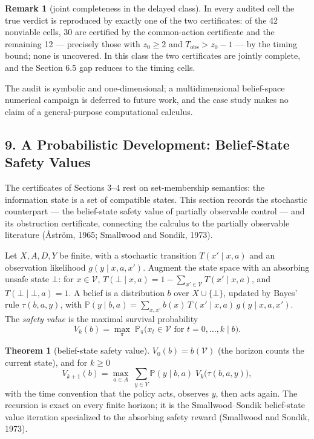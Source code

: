 \documentclass[10pt,twocolumn]{article}
\theoremstyle{definition}
\newtheorem{theorem}{Theorem}
\newtheorem{remark}{Remark}
\begin{document}
\begin{remark}[joint completeness in the delayed class]\label{rem:coverage}
In every audited cell the true verdict is reproduced by exactly one of the two certificates: of the 42 nonviable cells, 30 are certified by the common-action certificate and the remaining 12 --- precisely those with \(z_{0} \ge 2\) and \(T_{\mathrm{obs}} > z_{0} - 1\) --- by the timing bound; none is uncovered. In this class the two certificates are jointly complete, and the Section 6.5 gap reduces to the timing cells.
\end{remark}

The audit is symbolic and one-dimensional; a multidimensional belief-space
numerical campaign is deferred to future work, and the case study makes
no claim of a general-purpose computational calculus.

\subsection{9. A Probabilistic Development: Belief-State Safety Values}\label{probabilistic-development}

The certificates of Sections 3--4 rest on set-membership semantics: the information state is a set of compatible states. This section records the stochastic counterpart --- the belief-state safety value of partially observable control --- and its obstruction certificate, connecting the calculus to the partially observable literature (\r{A}str\"om, 1965; Smallwood and Sondik, 1973).

Let \(X, A, D, Y\) be finite, with a stochastic transition \(T(x' \mid x, a)\) and an observation likelihood \(g(y \mid x, a, x')\). Augment the state space with an absorbing unsafe state \(\bot\): for \(x \in \mathcal{V}\), \(T(\bot \mid x, a) = 1 - \sum_{x' \in \mathcal{V}} T(x' \mid x, a)\), and \(T(\bot \mid \bot, a) = 1\). A belief is a distribution \(b\) over \(X \cup \{\bot\}\), updated by Bayes' rule \(\tau(b, a, y)\), with \(\mathbb{P}(y \mid b, a) = \sum_{x, x'} b(x)\, T(x' \mid x, a)\, g(y \mid x, a, x')\). The \emph{safety value} is the maximal survival probability
\[
V_{k}(b) = \max_{\pi}\; \mathbb{P}_{\pi}\bigl( x_{t} \in \mathcal{V} \text{ for } t = 0, \dots, k \;\big|\; b \bigr).
\]

\begin{theorem}[belief-state safety value]\label{thm:pomdp}
\(V_{0}(b) = b(\mathcal{V})\) (the horizon counts the current state), and for \(k \ge 0\)
\[
V_{k+1}(b) = \max_{a \in A}\; \sum_{y \in Y} \mathbb{P}(y \mid b, a)\; V_{k}\bigl(\tau(b, a, y)\bigr),
\]
with the time convention that the policy acts, observes \(y\), then acts again. The recursion is exact on every finite horizon; it is the Smallwood--Sondik belief-state value iteration specialized to the absorbing safety reward (Smallwood and Sondik, 1973).
\end{theorem}
\end{document}
